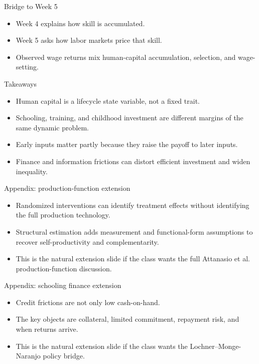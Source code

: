 \documentclass[aspectratio=169,11pt]{beamer}
\begin{document}
\begin{frame}{Bridge to Week 5}
\begin{itemize}
    \item Week 4 explains how skill is accumulated.
    \item Week 5 asks how labor markets price that skill.
    \item Observed wage returns mix human-capital accumulation, selection, and wage-setting.
\end{itemize}
\end{frame}

\begin{frame}{Takeaways}
\begin{itemize}
    \item Human capital is a lifecycle state variable, not a fixed trait.
    \item Schooling, training, and childhood investment are different margins of the same dynamic problem.
    \item Early inputs matter partly because they raise the payoff to later inputs.
    \item Finance and information frictions can distort efficient investment and widen inequality.
\end{itemize}
\end{frame}

\appendix

\begin{frame}{Appendix: production-function extension}
\begin{itemize}
    \item Randomized interventions can identify treatment effects without identifying the full production technology.
    \item Structural estimation adds measurement and functional-form assumptions to recover self-productivity and complementarity.
    \item This is the natural extension slide if the class wants the full Attanasio et al. production-function discussion.
\end{itemize}
\end{frame}

\begin{frame}{Appendix: schooling finance extension}
\begin{itemize}
    \item Credit frictions are not only low cash-on-hand.
    \item The key objects are collateral, limited commitment, repayment risk, and when returns arrive.
    \item This is the natural extension slide if the class wants the Lochner--Monge-Naranjo policy bridge.
\end{itemize}
\end{frame}
\end{document}
